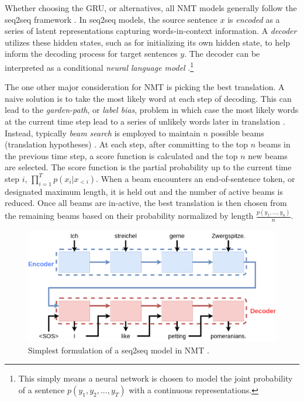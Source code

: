 Whether choosing the \ac{GRU}, or alternatives,  all \ac{NMT} models generally follow the \ac{seq2seq} framework \cite{vinyals2015grammaras}. In \ac{seq2seq} models, the source sentence $x$ is \textit{encoded} as a series of latent representations capturing words-in-context information. A \textit{decoder} utilizes these hidden states, such as for initializing its own hidden state, to help inform the decoding process for target sentences $y$. The decoder can be interpreted as a conditional \textit{neural language model} \cite{koehn2017NMT}.\footnote{This simply means a neural network is chosen to model the joint probability of a sentence $p(y_{1}, y_{2}, ..., y_{T})$ with a continuous representations.}

The one other major consideration for \ac{NMT} is picking the best translation. A naive solution is to take the most likely word at each step of decoding. This can lead to the \textit{garden-path}, or \textit{label bias}, problem in which case the most likely words at the current time step lead to a series of unlikely words later in translation \cite{lafferty2001CRF,koehn2017NMT}. Instead, typically \textit{beam search} is employed to maintain $n$ possible beams (translation hypotheses) \cite{koehn2017NMT}. At each step, after committing to the top $n$ beams  in the previous time step, a score function is calculated and the top $n$ new beams are selected. The score function is the partial probability up to the current time step $i$, $\prod^{T}_{i=1} p(x_{i} | x_{<i})$. When a beam encounters an end-of-sentence token, or designated maximum length, it is held out and the number of active beams is reduced. Once all beams are in-active, the best translation is then chosen from the remaining beams based on their probability normalized by length $\frac{p(y_{1}, ..., y_{n})}{n}$. 

\begin{figure}
	\includegraphics[width=\linewidth]{seq2seq.png}
	\caption{Simplest formulation of a \ac{seq2seq} model in \ac{NMT} \cite{sutskever2014seq2seq}.} 
	\label{fig:seqseq2}
\end{figure}



